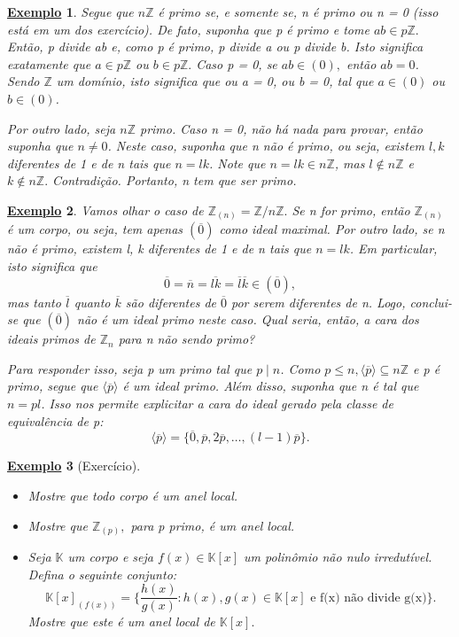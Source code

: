 \documentclass{article}
\newtheorem{example}{\underline{Exemplo}}
\begin{document}
\begin{example}
  Segue que \(n \mathbb{Z}\) é primo se, e somente se, n é primo ou n = 0 (isso está em um dos exercício).
  De fato, suponha que p é primo e tome \(ab\in p \mathbb{Z}.\) Então, p divide ab e, como p é primo, p divide a ou p divide b.
  Isto significa exatamente que \(a\in p\mathbb{Z}\) ou \(b\in p \mathbb{Z}.\) Caso p = 0, se \(ab\in (0),\) então
  \(ab=0\). Sendo \(\mathbb{Z}\) um domínio, isto significa que ou a = 0, ou b = 0, tal que \(a\in (0)\) ou \(b\in (0)\).

  Por outro lado, seja \(n \mathbb{Z}\) primo. Caso  n = 0, não há nada para provar, então suponha que \(n\neq 0\).
  Neste caso, suponha que n não é primo, ou seja, existem \(l, k\) diferentes de 1 e de n tais que \(n = lk\). Note que 
  \(n = lk\in n\mathbb{Z}\), mas \(l\not\in n \mathbb{Z}\) e \(k\not\in n \mathbb{Z}.\) Contradição. Portanto, n tem que ser primo.
\end{example}
\begin{example}
  Vamos olhar o caso de \(\mathbb{Z}_{(n)} = \mathbb{Z}/n \mathbb{Z}.\) Se n for primo, então \(\mathbb{Z}_{(n)}\) é um corpo, ou seja, tem apenas \((\overline{0})\) como 
  ideal maximal. Por outro lado, se n não é primo, existem l, k diferentes de 1 e de n tais que \(n = lk\). Em particular, isto significa que 
  \[
    \overline{0} = \overline{n} = \overline{lk} = \overline{l}\overline{k}\in (\overline{0}),
  \]
  mas tanto \(\overline{l}\) quanto \(\overline{k}\) são diferentes de \(\overline{0}\) por serem diferentes de n. Logo, conclui-se que \((\overline{0})\) não é
  um ideal primo neste caso. Qual seria, então, a cara dos ideais primos de \(\mathbb{Z}_{n}\) para n não sendo primo?

  Para responder isso, seja p um primo tal que \(p\mid n\). Como \(p\leq n, \langle \overline{p} \rangle\subseteq n \mathbb{Z}\) e p é primo, segue que 
  \(\langle \overline{p} \rangle\) é um ideal primo. Além disso, suponha que n é tal que \(n = pl\). Isso nos permite explicitar a cara do ideal gerado pela classe
  de equivalência de p:
  \[
    \langle \overline{p} \rangle = \{\overline{0}, \overline{p}, 2\overline{p}, \dotsc , (l-1)\overline{p}\}.
  \]
\end{example} 
\begin{example}[Exercício]
  \begin{itemize}
    \item[1)] Mostre que todo corpo é um anel local.
    \item[2)] Mostre que \(\mathbb{Z}_{(p)},\) para p primo, é um anel local.
    \item[3)] Seja \(\mathbb{K}\) um corpo e seja \(f(x)\in \mathbb{K}[x]\) um polinômio não nulo irredutível.
      Defina o seguinte conjunto:
      \[
        \mathbb{K}[x]_{(f(x))} = \biggl\{\frac{h(x)}{g(x)}: h(x), g(x)\in \mathbb{K}[x] \text{ e f(x) não divide g(x)}\biggr\}.
      \]
      Mostre que este é um anel local de \(\mathbb{K}[x].\)
  \end{itemize}
\end{example}
\end{document}
